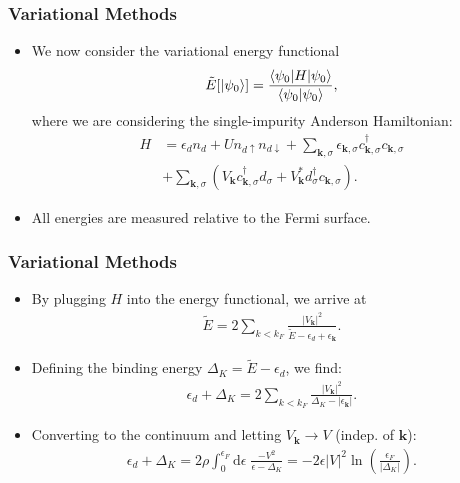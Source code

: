 \documentclass{beamer}
\newcommand{\dd}{\mathrm{d}}
\newcommand{\vv}[1]{\mathbf{\bm{#1}}}
\newcommand{\abs}[1]{\lvert #1 \rvert}
\begin{document}
\begin{frame}
  \frametitle{Variational Methods}

  \begin{itemize}
  \item We now consider the variational energy functional
    \begin{gather*}
      \tilde{E}[\ket{\psi_0}] = \frac{\braket{\psi_0 | H | \psi_0}}{\braket{\psi_0 | \psi_0}},
    \end{gather*}
    where we are considering the single-impurity Anderson Hamiltonian:
    \begin{align*}
      H &= \epsilon_d n_d + U n_{d\uparrow}n_{d\downarrow} + \sum_{\vv{k},\sigma} \epsilon_{\vv{k},\sigma}c^\dagger_{\vv{k},\sigma}c_{\vv{k},\sigma} \\
        &+ \sum_{\vv{k},\sigma} \left(V_{\vv{k}} c^\dagger_{\vv{k},\sigma}d_\sigma + V^*_{\vv{k}}d^\dagger_\sigma c_{\vv{k},\sigma}\right).
    \end{align*}
  \item All energies are measured relative to the Fermi surface.
  \end{itemize}
\end{frame}

\begin{frame}
  \frametitle{Variational Methods}

  \begin{itemize}
  \item By plugging $H$ into the energy functional, we arrive at
    \begin{gather*}
      \tilde{E} = 2 \sum_{k<k_F} \frac{\abs{V_{\vv{k}}}^2}{\tilde{E} - \epsilon_d + \epsilon_{\vv{k}}}.
    \end{gather*}
  \item Defining the binding energy $\Delta_K = \tilde{E} - \epsilon_d$, we find:
    \begin{gather*}
      \epsilon_d +\Delta_K = 2 \sum_{k<k_F} \frac{\abs{V_{\vv{k}}}^2}{\Delta_K - \abs{\epsilon_{\vv{k}}}}.
    \end{gather*}
  \item Converting to the continuum and letting $V_\vv{k} \rightarrow V$ (indep. of $\vv{k}$):
    \begin{gather*}
      \epsilon_d + \Delta_K = 2\rho\int_0^{\epsilon_F} \dd\epsilon \; \frac{-V^2}{\epsilon - \Delta_K} = -2\epsilon\abs{V}^2 \ln\left( \frac{\epsilon_F}{\abs{\Delta_K}} \right).
    \end{gather*}
  \end{itemize}
\end{frame}
\end{document}
